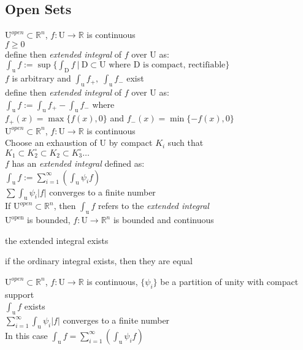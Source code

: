 \subsection{Open Sets}
\LET $\mathrm{U}^{open}\subset\mathbb{R}^n$, 
$f:\mathrm{U}\to\mathbb{R}$ is continuous\\
\IF $f\geq 0$\\
\THEN define then \textit{extended integral} of $f$ over U as:\\
$\int_{\mathrm{u}}f := \sup\{\int_{\mathrm{D}}f\:|\:
\mathrm{D}\subset\mathrm{U}\text{ where } \mathrm{D}\text{ is compact, rectifiable} \}$\\
\IF $f$ is arbitrary and 
 $\int_{\mathrm{u}}f_+,\;\int_{\mathrm{u}}f_-$ exist\\
\THEN define then \textit{extended integral} of $f$ over U as:\\
$\int_{\mathrm{u}}f:=\int_{\mathrm{u}}f_+-\int_{\mathrm{u}}f_-$ where\\
$f_+(x)=\max\{f(x),0\}$ and $f_-(x)=\min\{-f(x), 0\}$\\

\LET $\mathrm{U}^{open}\subset\mathbb{R}^n$,
$f:\mathrm{U}\to\mathbb{R}$ is continuous\\
Choose an exhaustion of U by compact $K_i$ such that\\
$K_1\subset K_2^{\circ}\subset K_2\subset K_3^{\circ}\ldots$\\
\THEN $f$ has an \textit{extended integral} defined as:\\
$\int_{\mathrm{u}}f:=\sum_{i=1}^{\infty}(\int_{\mathrm{u}}\psi_if)$\\
\IFF $\sum\int_{\mathrm{u}}\psi_i|f|$ converges to a finite number\\

\RMK
If $\mathrm{U}^{open}\subset\mathbb{R}^n$, then $\int_{\mathrm{u}}f$ refers to the 
\textit{extended integral}\\

\LET 
 $\mathrm{U^{open}}$ is bounded,  
$f:\mathrm{U}\to\mathbb{R}^n $ is bounded and continuous\\
\THEN 
\begin{myenumerate}
\item the extended integral exists  
\item if the ordinary integral exists, then they are equal 
\end{myenumerate}

\LET
$\mathrm{U}^{open}\subset\mathbb{R}^n$,
$f:\mathrm{U}\to\mathbb{R}$ is continuous, 
$\{\psi_i\}$ be a partition of unity with compact support\\ 
\THEN $\int_{\mathrm{u}}f$ exists\\
\IFF $\sum_{i=1}^{\infty}\int_{\mathrm{u}}\psi_i|f|$ converges to a finite number\\
In this case $\int_{\mathrm{u}}f =\sum\limits_{i=1}^
\infty(\int_{\mathrm{u}}\psi_i f)$\\

